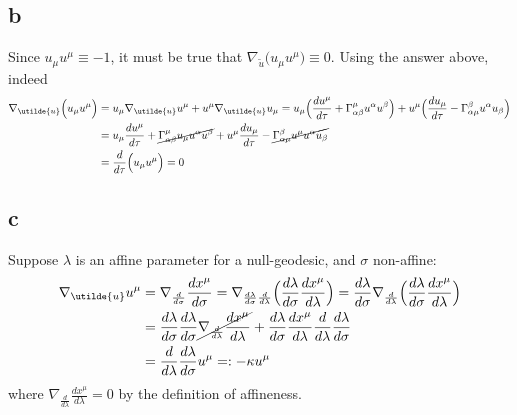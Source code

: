 \documentclass{article}
\begin{document}
\subsection*{b}
Since $u_\mu u^\mu \equiv -1$, it must be true that $\nabla_{\utilde{u}} \Big(u_\mu u^\mu\Big) \equiv 0$. Using the answer above, indeed
\begin{align*}
 \nabla_{\utilde{u}} \Big(u_\mu u^\mu\Big) 
&= u_\mu \nabla_{\utilde{u}} u^\mu + u^\mu \nabla_{\utilde{u}} u_\mu 
=  u_\mu \Big(\frac{du^\mu}{d\tau} + \Gamma^\mu_{\alpha\beta}u^\alpha u^\beta \Big)
	+ u^\mu \Big(  \frac{du_\mu}{d\tau} - \Gamma^\beta_{\alpha\mu}u^\alpha u_\beta \Big)\\
&=  u_\mu\frac{du^\mu}{d\tau} + \cancel{\Gamma^\mu_{\alpha\beta}u_\mu u^\alpha u^\beta}
	+  u^\mu  \frac{du_\mu}{d\tau} - \cancel{\Gamma^\beta_{\alpha\mu}u^\mu  u^\alpha u_\beta}\\
&= \frac{d}{d\tau}\Big(u_\mu u^\mu \Big) = 0
\end{align*}
\subsection*{c}
Suppose $\lambda$ is an affine parameter for a null-geodesic, and $\sigma$ non-affine:
\begin{align*}
 \nabla_{\utilde{u}}u^\mu &= \nabla_{\frac{d}{d\sigma}}\frac{dx^\mu}{d\sigma} 
	= \nabla_{\frac{d\lambda}{d\sigma}\frac{d}{d\lambda}}\Big(\frac{d\lambda}{d\sigma}\frac{dx^\mu}{d\lambda}\Big)
	= \frac{d\lambda}{d\sigma} \nabla_{\frac{d}{d\lambda}}\Big(\frac{d\lambda}{d\sigma}\frac{dx^\mu}{d\lambda}\Big) \\
	&= \frac{d\lambda}{d\sigma}\frac{d\lambda}{d\sigma} \cancel{\nabla_{\frac{d}{d\lambda}}\frac{dx^\mu}{d\lambda}}
	+ \frac{d\lambda}{d\sigma} \frac{dx^\mu}{d\lambda}\frac{d}{d\lambda}\frac{d\lambda}{d\sigma} \\
	&= \frac{d}{d\lambda}\frac{d\lambda}{d\sigma} u^\mu =: - \kappa u^\mu
\end{align*}
where $\nabla_{\frac{d}{d\lambda}}\frac{dx^\mu}{d\lambda} = 0$ by the definition of affineness.
\end{document}
